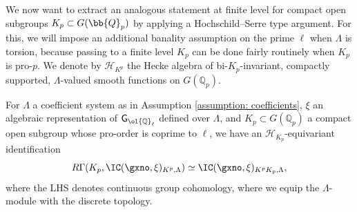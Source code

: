 \documentclass[letterpaper,11pt]{amsart}
\begin{document}
We now want to extract an analogous statement at finite level for compact open subgroups $K_{p} \subset G(\bb{Q}_{p})$ by applying a Hochschild--Serre type argument. For this, we will impose an additional banality assumption on the prime $\ell$ when $\Lambda$ is torsion, because passing to a finite level $K_{p}$ can be done fairly routinely when $K_p$ is pro-$p$. We denote by $\mathcal{H}_{K^p}$ the Hecke algebra of bi-$K_p$-invariant, compactly supported, $\Lambda$-valued smooth functions on $G(\mathbb{Q}_p)$. 

\begin{lemma}{\label{lemma: HochschildSerreforIntCohomology}}
For $\Lambda$ a coefficient system as in Assumption \ref{assumption: coefficients}, $\xi$ an algebraic representation of $\mathsf{G}_{\ol{\mathbb{Q}}_{\ell}}$ defined over $\Lambda$, and $K_{p} \subset G(\mathbb{Q}_{p})$ a compact open subgroup whose pro-order is coprime to $\ell$, we have an $\mathcal{H}_{K_p}$-equivariant identification 
\[
R\Gamma(K_{p},\IC(\gxno, \xi)_{K^{p},\Lambda}) \simeq \IC(\gxno,\xi)_{K^{p}K_{p},\Lambda}, 
\]
where the LHS denotes continuous group cohomology, where we equip the $\Lambda$-module with the discrete topology.
\end{lemma}
\end{document}
